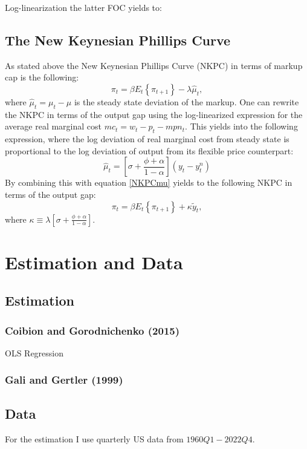 \documentclass[11pt, a4paper, leqno]{article}
\begin{document}
Log-linearization the latter FOC yields to:

\subsection{The New Keynesian Phillips Curve}
As stated above the New Keynesian Phillips Curve (NKPC) in terms of markup cap is the following:
\begin{equation} \label{NKPCmu}
	\pi_{t} = \beta E_{t} \left\{ \pi_{t+1} \right\} - \lambda \hat{\mu}_{t},
\end{equation}
where $\hat{\mu}_{t}= \mu_{t}-\mu$ is the steady state deviation of the markup.
One can rewrite the NKPC in terms of the output gap using the log-linearized expression for the average real marginal cost $mc_{t} = w_{t} - p_{t} - mpn_{t} $. This yields into the following expression, where the log deviation of real marginal cost from steady state is proportional to the log deviation of output from its flexible price counterpart:
\begin{equation}
	\hat{\mu}_{t}= \left[ \sigma + \frac{\phi + \alpha}{1- \alpha} \right] \left( y_{t} - y_{t}^{n} \right)
\end{equation}
By combining this with equation \ref{NKPCmu} yields to the following NKPC in terms of the output gap:
\begin{equation}  \label{NKPCygap}
	\pi_{t} = \beta E_{t} \left\{ \pi_{t+1} \right\} + \kappa \widetilde{y}_{t},
\end{equation}
where $\kappa \equiv \lambda \left[ \sigma + \frac{\phi + \alpha}{1- \alpha} \right] $.


\section{Estimation and Data} \label{estimation}
\subsection{Estimation}
\subsubsection{Coibion and Gorodnichenko (2015)}
OLS Regression

\subsubsection{Gali and Gertler (1999)}

\subsection{Data}
For the estimation I use quarterly US data from $1960Q1-2022Q4$.
\end{document}
